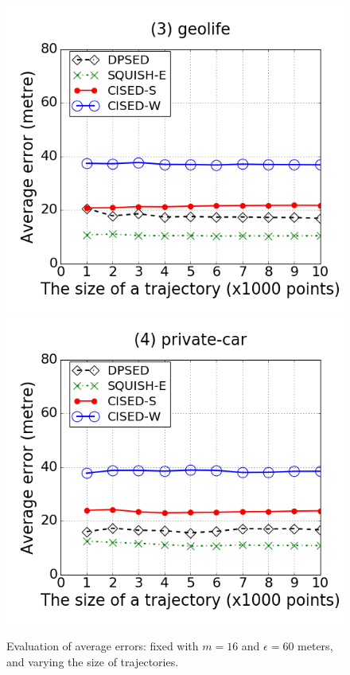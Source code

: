 \begin{figure}[tb!]
\includegraphics[scale = 0.240]{figures/Exp-error-size-geolife.png}
\includegraphics[scale = 0.240]{figures/Exp-error-size-private.png}
\vspace{-1ex}
\caption{\small Evaluation of average errors: fixed with $m=16$ and $\epsilon=60$ meters, and varying the size of trajectories.}
\label{fig:ae-size}
\vspace{-1ex}
\end{figure}


